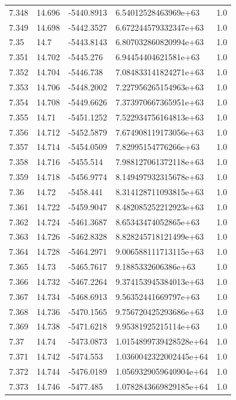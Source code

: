 \begin{tabular}{lllll}
7.348 & 14.696 & -5440.8913 & 6.54012528463969e+63 & 1.0 \\
7.349 & 14.698 & -5442.3527 & 6.672244579332347e+63 & 1.0 \\
7.35 & 14.7 & -5443.8143 & 6.807032860820994e+63 & 1.0 \\
7.351 & 14.702 & -5445.276 & 6.94454404621581e+63 & 1.0 \\
7.352 & 14.704 & -5446.738 & 7.084833141824271e+63 & 1.0 \\
7.353 & 14.706 & -5448.2002 & 7.227956265154963e+63 & 1.0 \\
7.354 & 14.708 & -5449.6626 & 7.373970667365951e+63 & 1.0 \\
7.355 & 14.71 & -5451.1252 & 7.522934756164813e+63 & 1.0 \\
7.356 & 14.712 & -5452.5879 & 7.674908119173056e+63 & 1.0 \\
7.357 & 14.714 & -5454.0509 & 7.82995154776266e+63 & 1.0 \\
7.358 & 14.716 & -5455.514 & 7.988127061372118e+63 & 1.0 \\
7.359 & 14.718 & -5456.9774 & 8.149497932315678e+63 & 1.0 \\
7.36 & 14.72 & -5458.441 & 8.314128711093815e+63 & 1.0 \\
7.361 & 14.722 & -5459.9047 & 8.482085252212923e+63 & 1.0 \\
7.362 & 14.724 & -5461.3687 & 8.65343474052865e+63 & 1.0 \\
7.363 & 14.726 & -5462.8328 & 8.828245718121499e+63 & 1.0 \\
7.364 & 14.728 & -5464.2971 & 9.006588111713115e+63 & 1.0 \\
7.365 & 14.73 & -5465.7617 & 9.1885332606386e+63 & 1.0 \\
7.366 & 14.732 & -5467.2264 & 9.374153945384013e+63 & 1.0 \\
7.367 & 14.734 & -5468.6913 & 9.56352441669797e+63 & 1.0 \\
7.368 & 14.736 & -5470.1565 & 9.756720425293686e+63 & 1.0 \\
7.369 & 14.738 & -5471.6218 & 9.95381925215114e+63 & 1.0 \\
7.37 & 14.74 & -5473.0873 & 1.0154899739428528e+64 & 1.0 \\
7.371 & 14.742 & -5474.553 & 1.0360042322002445e+64 & 1.0 \\
7.372 & 14.744 & -5476.0189 & 1.0569329059640904e+64 & 1.0 \\
7.373 & 14.746 & -5477.485 & 1.0782843669829185e+64 & 1.0 \\

\end{tabular}
